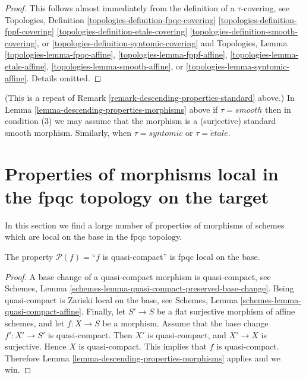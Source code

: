 \begin{proof}
This follows almost immediately from the definition of
a $\tau$-covering, see
Topologies, Definition
\ref{topologies-definition-fpqc-covering}
\ref{topologies-definition-fppf-covering}
\ref{topologies-definition-etale-covering}
\ref{topologies-definition-smooth-covering}, or
\ref{topologies-definition-syntomic-covering}
and Topologies, Lemma
\ref{topologies-lemma-fpqc-affine},
\ref{topologies-lemma-fppf-affine},
\ref{topologies-lemma-etale-affine},
\ref{topologies-lemma-smooth-affine}, or
\ref{topologies-lemma-syntomic-affine}.
Details omitted.
\end{proof}

\begin{remark}
\label{remark-descending-properties-morphisms-standard}
(This is a repeat of Remark \ref{remark-descending-properties-standard} above.)
In Lemma \ref{lemma-descending-properties-morphisms} above if
$\tau = smooth$ then in condition (3) we may assume that
the morphism is a (surjective) standard smooth morphism.
Similarly, when $\tau = syntomic$ or $\tau = \acute{e}tale$.
\end{remark}




\section{Properties of morphisms local in the fpqc topology on the target}
\label{section-descending-properties-morphisms-fpqc}

\noindent
In this section we find a large number of properties
of morphisms of schemes which are local on the base
in the fpqc topology.

\begin{lemma}
\label{lemma-descending-property-quasi-compact}
The property $\mathcal{P}(f) =$``$f$ is quasi-compact''
is fpqc local on the base.
\end{lemma}

\begin{proof}
A base change of a quasi-compact morphism is quasi-compact, see
Schemes, Lemma \ref{schemes-lemma-quasi-compact-preserved-base-change}.
Being quasi-compact is Zariski local on the base, see
Schemes, Lemma \ref{schemes-lemma-quasi-compact-affine}.
Finally, let
$S' \to S$ be a flat surjective morphism of affine schemes,
and let $f : X \to S$ be a morphism. Assume that the base change
$f' : X' \to S'$ is quasi-compact. Then $X'$ is quasi-compact,
and $X' \to X$ is surjective. Hence $X$ is quasi-compact.
This implies that $f$ is quasi-compact.
Therefore Lemma \ref{lemma-descending-properties-morphisms} applies and we win.
\end{proof}

